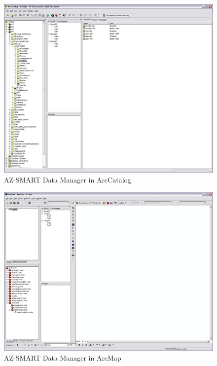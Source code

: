 \documentclass[titlepage]{article}
\begin{document}

\begin{figure}
\begin{center}
\includegraphics[scale=0.3]{figures/AZ-SMART_DataManager_in_ArcCatalog.jpg}
\caption{AZ-SMART Data Manager in ArcCatalog}
\label{figDataManagerArcCatlog}
\end{center}
\end{figure}

\begin{figure}
\begin{center}
\includegraphics[scale=0.3]{figures/AZ-SMART_DataManager_in_ArcMap.jpg}
\caption{AZ-SMART Data Manager in ArcMap}
\label{figDataManagerArcMap}
\end{center}
\end{figure}
\end{document}
